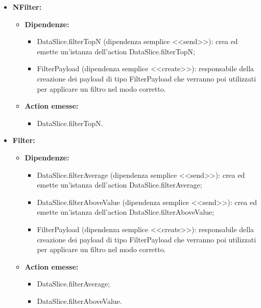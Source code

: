 \begin{itemize}
    \item \textbf{NFilter:}
          \begin{itemize}
              \item \textbf{Dipendenze:}
                    \begin{itemize}
                        \item DataSlice.filterTopN (dipendenza semplice <<send>>): crea ed emette un'istanza
                              dell'action DataSlice.filterTopN;
                        \item FilterPayload (dipendenza semplice <<create>>): responsabile della creazione
                              dei payload di tipo FilterPayload che verranno poi utilizzati per applicare un
                              filtro nel modo corretto.
                    \end{itemize}
              \item \textbf{Action emesse:}
                    \begin{itemize}
                        \item DataSlice.filterTopN.
                    \end{itemize}
          \end{itemize}

    \item \textbf{Filter:}
          \begin{itemize}
              \item \textbf{Dipendenze:}
                    \begin{itemize}
                        \item DataSlice.filterAverage (dipendenza semplice <<send>>): crea ed emette
                              un'istanza dell'action DataSlice.filterAverage;
                        \item DataSlice.filterAboveValue (dipendenza semplice <<send>>): crea ed emette
                              un'istanza dell'action DataSlice.filterAboveValue;
                        \item FilterPayload (dipendenza semplice <<create>>): responsabile della creazione
                              dei payload di tipo FilterPayload che verranno poi utilizzati per applicare un
                              filtro nel modo corretto.
                    \end{itemize}
              \item \textbf{Action emesse:}
                    \begin{itemize}
                        \item DataSlice.filterAverage;
                        \item DataSlice.filterAboveValue.
                    \end{itemize}
          \end{itemize}


\end{itemize}
